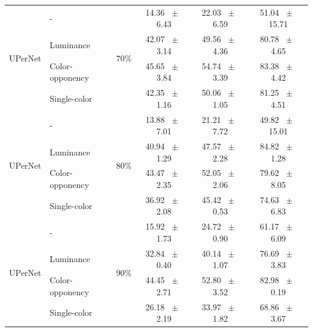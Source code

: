 \begin{table}[h]
\begin{tabular}{@{}l l c c c c@{}}
    \multirow{4}{*}{UPerNet} & - & \multirow{4}{*}{70\%} & 14.36 ~$\pm$~ 6.43 & 22.03 ~$\pm$~ 6.59 & 51.04 ~$\pm$~ 15.71 \\
    & Luminance &  & 42.07 ~$\pm$~ 3.14 & 49.56 ~$\pm$~ 4.36 & 80.78 ~$\pm$~ 4.65 \\
    & Color-opponency &  & 45.65 ~$\pm$~ 3.84 & 54.74 ~$\pm$~ 3.39 & 83.38 ~$\pm$~ 4.42 \\
    & Single-color &  & 42.35 ~$\pm$~ 1.16 & 50.06 ~$\pm$~ 1.05 & 81.25 ~$\pm$~ 4.51 \\
    \midrule
    \multirow{4}{*}{UPerNet} & - & \multirow{4}{*}{80\%} & 13.88 ~$\pm$~ 7.01 & 21.21 ~$\pm$~ 7.72 & 49.82 ~$\pm$~ 15.01 \\
    & Luminance &  & 40.94 ~$\pm$~ 1.29 & 47.57 ~$\pm$~ 2.28 & 84.82 ~$\pm$~ 1.28 \\
    & Color-opponency &  & 43.47 ~$\pm$~ 2.35 & 52.05 ~$\pm$~ 2.06 & 79.62 ~$\pm$~ 8.05 \\
    & Single-color &  & 36.92 ~$\pm$~ 2.08 & 45.42 ~$\pm$~ 0.53 & 74.63 ~$\pm$~ 6.83 \\
    \midrule
    \multirow{4}{*}{UPerNet} & - & \multirow{4}{*}{90\%} & 15.92 ~$\pm$~ 1.73 & 24.72 ~$\pm$~ 0.90 & 61.17 ~$\pm$~ 6.09 \\
    & Luminance &  & 32.84 ~$\pm$~ 0.40 & 40.14 ~$\pm$~ 1.07 & 76.69 ~$\pm$~ 3.83 \\
    & Color-opponency &  & 44.45 ~$\pm$~ 2.71 & 52.80 ~$\pm$~ 3.52 & 82.98 ~$\pm$~ 0.19 \\
    & Single-color &  & 26.18 ~$\pm$~ 2.19 & 33.97 ~$\pm$~ 1.82 & 68.86 ~$\pm$~ 3.67 \\
    \midrule
    \bottomrule
  \end{tabular}
  \label{tab:upernet_acdc_fog}
\end{table}